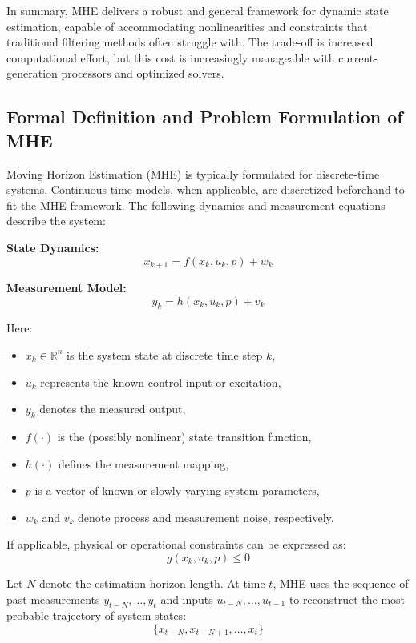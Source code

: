 In summary, MHE delivers a robust and general framework for dynamic state estimation, capable of accommodating nonlinearities and constraints that traditional filtering methods often struggle with. The trade-off is increased computational effort, but this cost is increasingly manageable with current-generation processors and optimized solvers.


\subsection{Formal Definition and Problem Formulation of MHE}

Moving Horizon Estimation (MHE) is typically formulated for discrete-time systems. Continuous-time models, when applicable, are discretized beforehand to fit the MHE framework. The following dynamics and measurement equations describe the system:

\textbf{State Dynamics:}
\begin{equation}
    x_{k+1} = f(x_k, u_k, p) + w_k
\end{equation}

\textbf{Measurement Model:}
\begin{equation}
    y_k = h(x_k, u_k, p) + v_k
\end{equation}

Here:
\begin{itemize}
    \item $x_k \in \mathbb{R}^n$ is the system state at discrete time step $k$,
    \item $u_k$ represents the known control input or excitation,
    \item $y_k$ denotes the measured output,
    \item $f(\cdot)$ is the (possibly nonlinear) state transition function,
    \item $h(\cdot)$ defines the measurement mapping,
    \item $p$ is a vector of known or slowly varying system parameters,
    \item $w_k$ and $v_k$ denote process and measurement noise, respectively.
\end{itemize}

If applicable, physical or operational constraints can be expressed as:
\begin{equation}
    g(x_k, u_k, p) \leq 0
\end{equation}

Let $N$ denote the estimation horizon length. At time $t$, MHE uses the sequence of past measurements $y_{t-N}, \ldots, y_t$ and inputs $u_{t-N}, \ldots, u_{t-1}$ to reconstruct the most probable trajectory of system states:
\[
\{x_{t-N}, x_{t-N+1}, \ldots, x_t\}
\]


